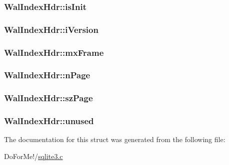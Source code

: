 \hypertarget{struct_wal_index_hdr_a1cc0dc2be6cd108a7bcca260be3e4cb9}{
\subsubsection[{is\-Init}]{ Wal\-Index\-Hdr\-::is\-Init}}\label{struct_wal_index_hdr_a1cc0dc2be6cd108a7bcca260be3e4cb9}
\hypertarget{struct_wal_index_hdr_a49295f5eb9d6f37a1498cf1a66410b92}{
\subsubsection[{i\-Version}]{ Wal\-Index\-Hdr\-::i\-Version}}\label{struct_wal_index_hdr_a49295f5eb9d6f37a1498cf1a66410b92}
\hypertarget{struct_wal_index_hdr_aa697dbe8134daf3d02dce07feb897f41}{
\subsubsection[{mx\-Frame}]{ Wal\-Index\-Hdr\-::mx\-Frame}}\label{struct_wal_index_hdr_aa697dbe8134daf3d02dce07feb897f41}
\hypertarget{struct_wal_index_hdr_ae4ca33947cd629feb9dce2b1f976c364}{
\subsubsection[{n\-Page}]{ Wal\-Index\-Hdr\-::n\-Page}}\label{struct_wal_index_hdr_ae4ca33947cd629feb9dce2b1f976c364}
\hypertarget{struct_wal_index_hdr_a74e9182803402942cf6e45d8e23589c7}{
\subsubsection[{sz\-Page}]{ Wal\-Index\-Hdr\-::sz\-Page}}\label{struct_wal_index_hdr_a74e9182803402942cf6e45d8e23589c7}
\hypertarget{struct_wal_index_hdr_aa00596b4ad38dce7f97261a49ce64d74}{
\subsubsection[{unused}]{ Wal\-Index\-Hdr\-::unused}}\label{struct_wal_index_hdr_aa00596b4ad38dce7f97261a49ce64d74}


The documentation for this struct was generated from the following file\-:\begin{DoxyCompactItemize}
\item 
Do\-For\-Me!/\hyperlink{sqlite3_8c}{sqlite3.\-c}\end{DoxyCompactItemize}
